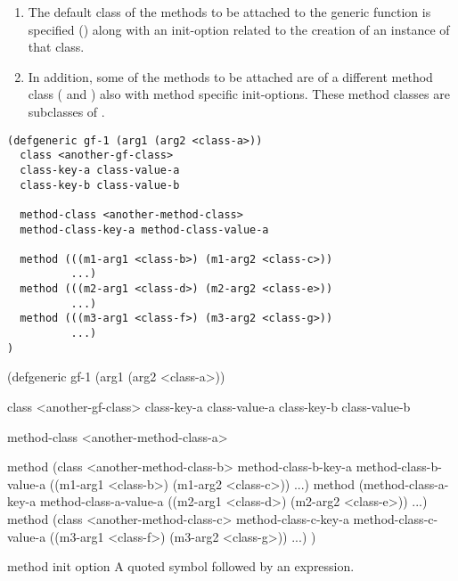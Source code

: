 \begin{optDefinition}
\begin{enumerate}
    \item The default class of the methods to be attached to the generic
    function is specified () along with an
    init-option related to the creation of an instance of that class.

    \item In addition, some of the methods to be attached are of a different
    method class ( and
    ) also with method specific init-options.
    These method classes are subclasses of .
\end{enumerate}
%
\begin{optPrivate}
{\begin{verbatim}
(defgeneric gf-1 (arg1 (arg2 <class-a>))
  class <another-gf-class>
  class-key-a class-value-a
  class-key-b class-value-b

  method-class <another-method-class>
  method-class-key-a method-class-value-a

  method (((m1-arg1 <class-b>) (m1-arg2 <class-c>))
          ...)
  method (((m2-arg1 <class-d>) (m2-arg2 <class-e>))
          ...)
  method (((m3-arg1 <class-f>) (m3-arg2 <class-g>))
          ...)
)\end{verbatim}}
%
\end{optPrivate}
{\codeExample
(defgeneric gf-1 (arg1 (arg2 <class-a>))

  class <another-gf-class>
  class-key-a class-value-a
  class-key-b class-value-b

  method-class <another-method-class-a>

  method (class <another-method-class-b>
          method-class-b-key-a method-class-b-value-a
          ((m1-arg1 <class-b>) (m1-arg2 <class-c>))
          ...)
  method (method-class-a-key-a method-class-a-value-a
          ((m2-arg1 <class-d>) (m2-arg2 <class-e>))
          ...)
  method (class <another-method-class-c>
          method-class-c-key-a method-class-c-value-a
          ((m3-arg1 <class-f>) (m3-arg2 <class-g>))
          ...)
)
\endCodeExample}


\Syntax
{}
%
\begin{arguments}
    \item[method init option] A quoted symbol followed by an expression.


\end{arguments}
\end{optDefinition}
